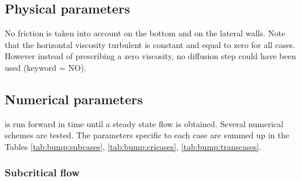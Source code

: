 \subsection{Physical parameters}

No friction is taken into account on the bottom and on the lateral walls.
Note that the horizontal viscosity turbulent is constant and equal to zero for all cases.
However instead of prescribing a zero viscosity, no diffusion step could
have been used (keyword  = NO).

\subsection{Numerical parameters}

 is run forward in time until a steady state flow is obtained.
Several numerical schemes are tested.
The parameters specific to each case are summed up in the Tables
\ref{tab:bump:subcases}, \ref{tab:bump:cricases}, \ref{tab:bump:transcases}.

\subsubsection{Subcritical flow}
\begin{table}[H]
  \caption{List of the simulation parameters used for the cases tested in the subcritical bump example.}
  \label{tab:bump:subcases}
\end{table}

